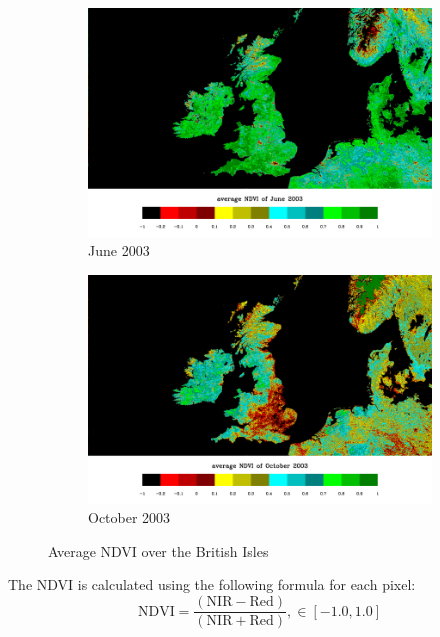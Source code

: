 \begin{figure}[H]
\begin{subfigure}{0.5\textwidth}
\centering
\includegraphics[scale=0.25]{images/NDVI_062003.png}
\caption{June 2003}
\end{subfigure}
\begin{subfigure}{0.5\textwidth}
\centering
\includegraphics[scale=0.25]{images/NDVI_102003.png}
\caption{October 2003}
\end{subfigure}
\caption{Average NDVI over the British Isles \cite{ndvi_wiki}}
\label{fig:ndvi_british}
\end{figure}

\noindent
The NDVI is calculated using the following formula for each pixel:\\

\begin{equation}\label{eq:ndvi}
{\displaystyle{\mbox{NDVI}}={\frac {({\mbox{NIR}}-{\mbox{Red}})}{({\mbox{NIR}}+{\mbox{Red}})}}}, \in [-1.0, 1.0]
\end{equation}

